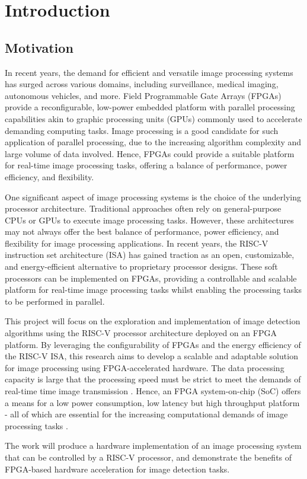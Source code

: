 \chapter[Introduction]{Introduction}

\label{Chap:Motivation}

\section{Motivation}

In recent years, the demand for efficient and versatile image processing systems has surged across various domains, including surveillance, medical imaging, autonomous vehicles, and more. 
Field Programmable Gate Arrays (FPGAs) provide a reconfigurable, low-power embedded platform with parallel processing capabilities akin to graphic processing units (GPUs) commonly used to accelerate demanding computing tasks. 
Image processing is a good candidate for such application of parallel processing, due to the increasing algorithm complexity and large volume of data involved. \cite{Efficient}
Hence, FPGAs could provide a suitable platform for real-time image processing tasks, offering a balance of performance, power efficiency, and flexibility.

One significant aspect of image processing systems is the choice of the underlying processor architecture. 
Traditional approaches often rely on general-purpose CPUs or GPUs to execute image processing tasks. 
However, these architectures may not always offer the best balance of performance, power efficiency, and flexibility for image processing applications. 
In recent years, the RISC-V instruction set architecture (ISA) has gained traction as an open, customizable, and energy-efficient alternative to proprietary processor designs.
These soft processors can be implemented on FPGAs, providing a controllable and scalable platform for real-time image processing tasks whilst enabling the processing tasks to be performed in parallel.

This project will focus on the exploration and implementation of image detection algorithms using the RISC-V processor architecture deployed on an FPGA platform. 
By leveraging the configurability of FPGAs and the energy efficiency of the RISC-V ISA, this research aims to develop a scalable and adaptable solution for image processing using FPGA-accelerated hardware.
The data processing capacity is large that the processing speed must be strict to meet the demands of real-time time image transmission \cite{Video}.
Hence, an FPGA system-on-chip (SoC) offers a means for a low power consumption, low latency but high throughput platform - all of which are essential for the increasing computational demands of image processing tasks \cite{Throughput}.

The work will produce a hardware implementation of an image processing system that can be controlled by a RISC-V processor, and demonstrate the benefits of FPGA-based hardware acceleration for image detection tasks.